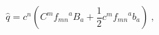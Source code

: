 \begin{equation}
{\hat q}= c^{n} (C^{m} {f _{mn}}^{a} B_{a} + \frac{1}{2} c^{m} {f_{mn}}^{a} b_{a})~,     
\end{equation}

